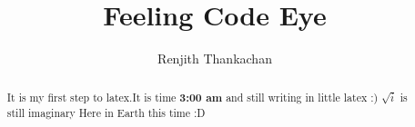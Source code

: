 \documentclass[]{article}
\begin{document}
\title{Feeling Code Eye}
\author{Renjith Thankachan}
\maketitle

\begin{abstract}
It is my first step to latex.It is time \textbf{3:00 am} and still writing in little latex :) 
$\sqrt{i}$ is still imaginary Here in Earth this time :D
\end{abstract}
\end{document}
